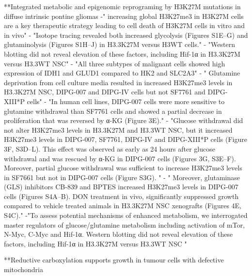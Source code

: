 \documentclass[11pt,a4paper]{article}
\begin{document}
**Integrated metabolic and epigenomic reprograming by H3K27M mutations in diffuse intrinsic pontine gliomas
-" increasing global H3K27me3 in H3K27M cells are a key therapeutic strategy leading to cell death of H3K27M cells in vitro and in vivo"
- "Isotope tracing revealed both increased glycolysis (Figures S1E–G) and glutaminolysis (Figures S1H–J) in H3.3K27M versus H3WT cells."
- "Western blotting did not reveal elevation of these factors, including Hif-1α in H3.3K27M versus H3.3WT NSC"
- "All three subtypes of malignant cells showed high expression of IDH1 and GLUD1 compared to HK2 and SLC2A3"
- " Glutamine deprivation from cell culture media resulted in increased H3K27me3 levels in H3.3K27M NSC, DIPG-007 and DIPG-IV cells but not SF7761 and DIPG-XIII*P cells"
- "In human cell lines, DIPG-007 cells were more sensitive to glutamine withdrawal than SF7761 cells and showed a partial decrease in proliferation that was reversed by α-KG (Figure 3E)."
 - "Glucose withdrawal did not alter H3K27me3 levels in H3.3K27M and H3.3WT NSC, but it increased H3K27me3 levels in DIPG-007, SF7761, DIPG-IV and DIPG-XIII*P cells (Figure 3F, S3D–L). This effect was observed as early as 24 hours after glucose withdrawal and was rescued by α-KG in DIPG-007 cells (Figures 3G, S3E–F). Moreover, partial glucose withdrawal was sufficient to increase H3K27me3 levels in SF7661 but not in DIPG-007 cells (Figure S3G). "
 - " Moreover, glutaminase (GLS) inhibitors CB-839 and BPTES increased H3K27me3 levels in DIPG-007 cells (Figures S4A–B). DON treatment in vivo, significantly suppressed growth compared to vehicle treated animals in H3.3K27M NSC xenografts (Figures 4E, S4C)."
 -"To assess potential mechanisms of enhanced metabolism, we interrogated master regulators of glucose/glutamine metabolism including activation of mTor, N-Myc, C-Myc and Hif-1α. Western blotting did not reveal elevation of these factors, including Hif-1α in H3.3K27M versus H3.3WT NSC "
 
**Reductive carboxylation supports growth in tumour cells with defective mitochondria
\end{document}
